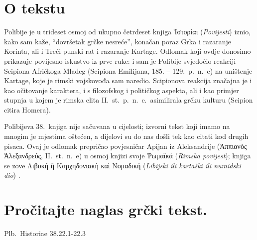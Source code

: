 


\section*{O tekstu}

Polibije je u trideset osmoj od ukupno četrdeset knjiga \textgreek[variant=ancient]{Ἱστορίαι} (\textit{Povijesti}) iznio, kako sam kaže, ``dovršetak grčke nesreće'', konačan poraz Grka i razaranje Korinta, ali i Treći punski rat i razaranje Kartage. Odlomak koji ovdje donosimo prikazuje povijesno iskustvo iz prve ruke: i sam je Polibije svjedočio reakciji Scipiona Afričkoga Mlađeg (Scipiona Emilijana, 185. – 129.\ p.~n.~e) na uništenje Kartage, koje je rimski vojskovođa sam naredio. Scipionova reakcija značajna je i kao očitovanje karaktera, i s filozofskog i političkog aspekta, ali i kao primjer stupnja u kojem je rimska elita II.~st.\ p.~n.~e.\ asimilirala grčku kulturu (Scipion citira Homera).

Polibijeva 38.\ knjiga nije sačuvana u cijelosti; izvorni tekst koji imamo na mnogim je mjestima oštećen, a dijelovi su do nas došli tek kao citati kod drugih pisaca. Ovaj je odlomak prepričao povjesničar Apijan iz Aleksandrije \textgreek[variant=ancient]{(Ἀππιανὸς Ἀλεξανδρεύς,} II.~st.\ n.~e) u osmoj knjizi svoje \textgreek[variant=ancient]{Ῥωμαϊκά} (\textit{Rimska povijest}); knjiga se zove \textgreek[variant=ancient]{Λιβυκή ἢ Καρχηδονιακὴ καὶ Νομαδική} (\textit{Libijski ili kartaški ili numidski dio}) .


\section*{Pročitajte naglas grčki tekst.}

Plb.\ Historiae 38.22.1-22.3


\medskip


